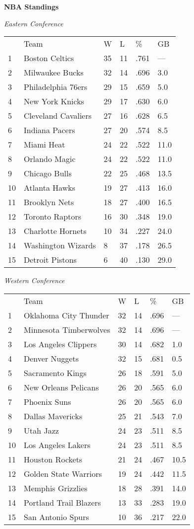 \textbf{NBA Standings}

\textit{Eastern Conference}
\begin{tabular}{llllll}
 & Team & W & L & \% & GB \\
1 & Boston Celtics & 35 & 11 & .761 & — \\
2 & Milwaukee Bucks & 32 & 14 & .696 & 3.0 \\
3 & Philadelphia 76ers & 29 & 15 & .659 & 5.0 \\
4 & New York Knicks & 29 & 17 & .630 & 6.0 \\
5 & Cleveland Cavaliers & 27 & 16 & .628 & 6.5 \\
6 & Indiana Pacers & 27 & 20 & .574 & 8.5 \\
7 & Miami Heat & 24 & 22 & .522 & 11.0 \\
8 & Orlando Magic & 24 & 22 & .522 & 11.0 \\
9 & Chicago Bulls & 22 & 25 & .468 & 13.5 \\
10 & Atlanta Hawks & 19 & 27 & .413 & 16.0 \\
11 & Brooklyn Nets & 18 & 27 & .400 & 16.5 \\
12 & Toronto Raptors & 16 & 30 & .348 & 19.0 \\
13 & Charlotte Hornets & 10 & 34 & .227 & 24.0 \\
14 & Washington Wizards & 8 & 37 & .178 & 26.5 \\
15 & Detroit Pistons & 6 & 40 & .130 & 29.0 \\
\end{tabular}


\textit{Western Conference}
\begin{tabular}{llllll}
 & Team & W & L & \% & GB \\
1 & Oklahoma City Thunder & 32 & 14 & .696 & — \\
2 & Minnesota Timberwolves & 32 & 14 & .696 & — \\
3 & Los Angeles Clippers & 30 & 14 & .682 & 1.0 \\
4 & Denver Nuggets & 32 & 15 & .681 & 0.5 \\
5 & Sacramento Kings & 26 & 18 & .591 & 5.0 \\
6 & New Orleans Pelicans & 26 & 20 & .565 & 6.0 \\
7 & Phoenix Suns & 26 & 20 & .565 & 6.0 \\
8 & Dallas Mavericks & 25 & 21 & .543 & 7.0 \\
9 & Utah Jazz & 24 & 23 & .511 & 8.5 \\
10 & Los Angeles Lakers & 24 & 23 & .511 & 8.5 \\
11 & Houston Rockets & 21 & 24 & .467 & 10.5 \\
12 & Golden State Warriors & 19 & 24 & .442 & 11.5 \\
13 & Memphis Grizzlies & 18 & 28 & .391 & 14.0 \\
14 & Portland Trail Blazers & 13 & 33 & .283 & 19.0 \\
15 & San Antonio Spurs & 10 & 36 & .217 & 22.0 \\
\end{tabular}



